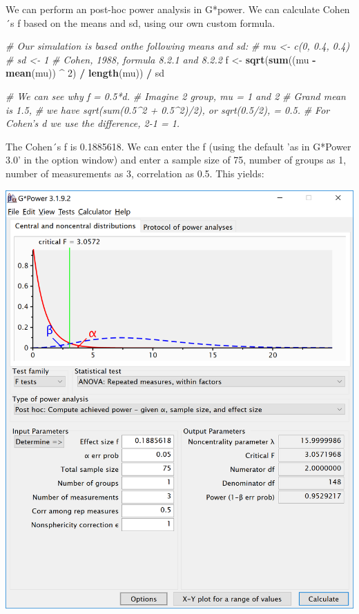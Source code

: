 \documentclass[]{book}
\newenvironment{Shaded}{\begin{snugshade}}{\end{snugshade}}
\newcommand{\CommentTok}[1]{\textcolor[rgb]{0.56,0.35,0.01}{\textit{#1}}}
\newcommand{\DecValTok}[1]{\textcolor[rgb]{0.00,0.00,0.81}{#1}}
\newcommand{\KeywordTok}[1]{\textcolor[rgb]{0.13,0.29,0.53}{\textbf{#1}}}
\newcommand{\NormalTok}[1]{#1}
\newcommand{\OperatorTok}[1]{\textcolor[rgb]{0.81,0.36,0.00}{\textbf{#1}}}
\newcommand{\StringTok}[1]{\textcolor[rgb]{0.31,0.60,0.02}{#1}}
\begin{document}
We can perform an post-hoc power analysis in G*power. We can calculate Cohen´s f based on the means and sd, using our own custom formula.

\begin{Shaded}
\begin{Highlighting}[]
\CommentTok{# Our simulation is based onthe following means and sd:}
\CommentTok{# mu <- c(0, 0.4, 0.4)}
\CommentTok{# sd <- 1}
\CommentTok{# Cohen, 1988, formula 8.2.1 and 8.2.2}
\NormalTok{f <-}\StringTok{ }\KeywordTok{sqrt}\NormalTok{(}\KeywordTok{sum}\NormalTok{((mu }\OperatorTok{-}\StringTok{ }\KeywordTok{mean}\NormalTok{(mu)) }\OperatorTok{^}\StringTok{ }\DecValTok{2}\NormalTok{) }\OperatorTok{/}\StringTok{ }\KeywordTok{length}\NormalTok{(mu)) }\OperatorTok{/}\StringTok{ }\NormalTok{sd }

\CommentTok{# We can see why f = 0.5*d.}
\CommentTok{# Imagine 2 group, mu = 1 and 2}
\CommentTok{# Grand mean is 1.5, }
\CommentTok{# we have sqrt(sum(0.5^2 + 0.5^2)/2), or sqrt(0.5/2), = 0.5.}
\CommentTok{# For Cohen's d we use the difference, 2-1 = 1. }
\end{Highlighting}
\end{Shaded}

The Cohen´s f is 0.1885618. We can enter the f (using the default 'as in G*Power 3.0' in the option window) and enter a sample size of 75, number of groups as 1, number of measurements as 3, correlation as 0.5. This yields:

\includegraphics{screenshots/gpower_3.png}
\end{document}
